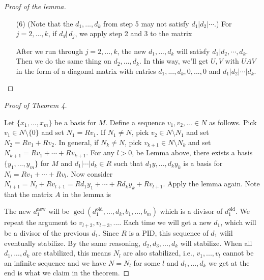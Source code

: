 \documentclass{article}
\theoremstyle{definition}
\newenvironment{proofs}[1][\proofname]{%
  \begin{proof}[#1]$ $\par\nobreak\ignorespaces
}{%
  \end{proof}
}
\begin{document}
\begin{proofs}[Proof of the lemma]
\begin{enumerate}
		\item[(6)] (Note that the $d_1, ..., d_k$ from step 5 may not satisfy $d_1 | d_2 | \cdots$.)
			For $j = 2, ..., k$, if $d_1 \not| \, d_j$, we apply step 2 and 3 to the matrix\\

			\par After we run through $j = 2, ..., k$, the new $d_1, ..., d_k$ will satisfy $d_1 | d_2 , \cdots , d_k$.
			Then we do the same thing on $d_2, ..., d_k$.
			In this way, we'll get $U, V$ with $UAV$ in the form of a diagonal matrix with entries $d_1, ..., d_k, 0, ..., 0$ and $d_1 | d_2 | \cdots | d_k$.
	\end{enumerate}
\end{proofs}

\begin{proofs}[Proof of Theorem 4]
	Let $\{x_1, ..., x_m\}$ be a basis for $M$.
	Define a sequence $v_1, v_2, ... \in N$ as follows.
	Pick $v_1 \in N \setminus \{0\}$ and set $N_1 = R v_1$.
	If $N_1 \neq N$, pick $v_2 \in N \setminus N_1$ and set $N_2 = R v_1 + R v_2$.
	In general, if $N_k \neq N$, pick $v_{k + 1} \in N \setminus N_k$ and set $N_{k + 1} = R v_1 + \cdots + R v_{k + 1}$.
	For any $l > 0$, be Lemma above, there exists a basis $\{y_1, ..., y_m\}$ for $M$ and $d_1 | \cdots | d_k \in R$ such that $d_1 y, ..., d_k y_k$ is a basis for $N_l = R v_1 + \cdots + R v_l$.
	Now consider $N_{l + 1} = N_l + R v_{l + 1} = R d_1 y_1 + \cdots + R d_k y_k + R v_{l + 1}$.
	Apply the lemma again.
	Note that the matrix $A$ in the lemma is\\

	\par The new $d_1^{\text{new}}$ will be $\gcd(d_1^{\text{old}}, ..., d_k, b_1, ..., b_m)$ which is a divisor of $d_1^{\text{old}}$.
	We repeat the argument to $v_{l + 2}, v_{l + 3}, ...$.
	Each time we will get a new $d_1$, which will be a divisor of the previous $d_1$.
	Since $R$ is a PID, this sequence of $d_1$ wilil eventually stabilize.
	By the same reasoning, $d_2, d_3, ..., d_k$ will stabilize.
	When all $d_1, ..., d_k$ are stabilized, this means $N_l$ are also stabilized, i.e., $v_1, ..., v_l$ cannot be an infinite sequence and we have $N = N_l$ for some $l$ and $d_1, ..., d_k$ we get at the end is what we claim in the theorem.
\end{proofs}
\end{document}
